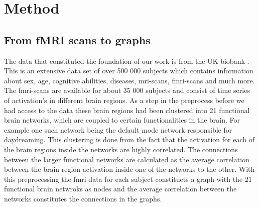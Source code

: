 \chapter{Method}

\section{From fMRI scans to graphs}
The data that constituted the foundation of our work is from the UK biobank \cite{}. This is an extensive data set of over 500 000 subjects which contains information about sex, age, cognitive abilities, diseases, mri-scans, fmri-scans and much more. The fmri-scans are available for about 35 000 subjects and consist of time series of activation's in different brain regions. As a step in the preprocess before we had access to the data these brain regions had been clustered into 21 functional brain networks, which are coupled to certain functionalities in the brain. For example one such network being the default mode network responsible for daydreaming. This clustering is done from the fact that the activation for each of the brain regions inside the networks are highly correlated. The connections between the larger functional networks are calculated as the average correlation between the brain region activation inside one of the networks to the other. With this preprocessing the fmri data for each subject constituets a graph with the 21 functional brain netwroks as nodes and the average correlation between the networks constitutes the connections in the graphs. 

